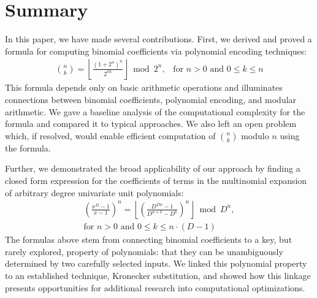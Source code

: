 \documentclass{article}
\theoremstyle{plain}
\theoremstyle{definition}
\begin{document}
\section{Summary}
In this paper, we have made several contributions. First, we derived and proved a formula for computing binomial coefficients via polynomial encoding techniques:
\begin{align*}
    \binom{n}{k} = \left\lfloor\frac{(1 + 2^{n})^{n}}{2^{n k}}\right\rfloor \bmod{2^{n}}\text{,} \quad \text{for } n > 0 \text{ and } 0 \leq k \leq n
\end{align*}
This formula depends only on basic arithmetic operations and illuminates connections between binomial coefficients, polynomial encoding, and modular arithmetic. We gave a baseline analysis of the computational complexity for the formula and compared it to typical approaches. We also left an open problem which, if resolved, would enable efficient computation of \(\binom{n}{k}\) modulo \(n\) using the formula.

Further, we demonstrated the broad applicability of our approach by finding a closed form expression for the coefficients of terms in the multinomial expansion of arbitrary degree univariate unit polynomials:
\begin{align*}
    [x^k] \left(\frac{x^{D}-1}{x-1}\right)^n = \left\lfloor \left(\frac{D^{Dn} - 1}{D^{n+k} - D^k}\right)^n\right\rfloor \bmod D^n, \\ \text{for } n > 0 \text{ and } 0 \leq k \leq n \cdot (D-1)
\end{align*}
The formulas above stem from connecting binomial coefficients to a key, but rarely explored, property of polynomials: that they can be unambiguously determined by two carefully selected inputs. We linked this polynomial property to an established technique, Kronecker substitution, and showed how this linkage presents opportunities for additional research into computational optimizations.



\end{document}

